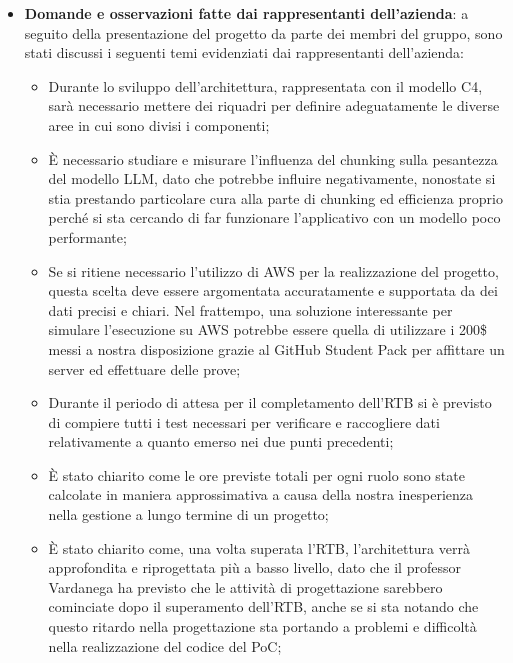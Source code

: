 \begin{itemize}
\begin{itemize}
\begin{itemize}
        \end{itemize}
        \item Il frontend realizzato fino ad oggi, utilizzando Angular;
        \item I container, realizzati utilizzando Docker con il principio \textit{infrastructure as code} per rendere il codice facilmente replicabile e mantenibile;
        \item Il database, che contiene tutti i dati raccolti tramite l'operazione di scraping effettuata sulla documentazione dei prodotti Vimar, realizzato con Postgres e l'utilizzo della sua estensione Vector.
    \end{itemize}
    \item \textbf{Domande e osservazioni fatte dai rappresentanti dell'azienda}: a seguito della presentazione del progetto da parte dei membri del gruppo, sono stati discussi i seguenti temi evidenziati dai rappresentanti dell'azienda:
    \begin{itemize}
        \item Durante lo sviluppo dell'architettura, rappresentata con il modello C4, sarà necessario mettere dei riquadri per definire adeguatamente le diverse aree in cui sono divisi i componenti;
        \item \`E necessario studiare e misurare l'influenza del chunking sulla pesantezza del modello LLM, dato che potrebbe influire negativamente, nonostate si stia prestando particolare cura alla parte di chunking ed efficienza proprio perché si sta cercando di far funzionare l'applicativo con un modello poco performante;
        \item Se si ritiene necessario l'utilizzo di AWS per la realizzazione del progetto, questa scelta deve essere argomentata accuratamente e supportata da dei dati precisi e chiari. Nel frattempo, una soluzione interessante per simulare l'esecuzione su AWS potrebbe essere quella di utilizzare i 200\$ messi a nostra disposizione grazie al GitHub Student Pack per affittare un server ed effettuare delle prove;
        \item Durante il periodo di attesa per il completamento dell'RTB si è previsto di compiere tutti i test necessari per verificare e raccogliere dati relativamente a quanto emerso nei due punti precedenti;
        \item \`E stato chiarito come le ore previste totali per ogni ruolo sono state calcolate in maniera approssimativa a causa della nostra inesperienza nella gestione a lungo termine di un progetto;
        \item \`E stato chiarito come, una volta superata l'RTB, l'architettura verrà approfondita e riprogettata più a basso livello, dato che il professor Vardanega ha previsto che le attività di progettazione sarebbero cominciate dopo il superamento dell'RTB, anche se si sta notando che questo ritardo nella progettazione sta portando a problemi e difficoltà nella realizzazione del codice del PoC;

\end{itemize}
\end{itemize}
